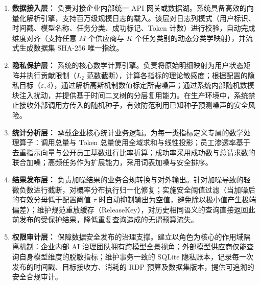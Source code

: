 \begin{enumerate}[label=\textbf{\arabic*.}, leftmargin=2em]
  \item \textbf{数据接入层：}
  负责对接企业内部统一 API 网关或数据湖。系统具备高效的向量化解析引擎，支持百万级规模日志的载入。该层对日志列模式（用户标识、时间戳、模型名称、任务分类、成功标记、Token 计数）进行校验，自动完成维度对齐（支持任意 $M$ 个供应商与 $K$ 个任务类别的动态分类学映射），并流式生成数据集 SHA-256 唯一指纹。
  
  \item \textbf{隐私保护层：}
  系统的核心数学计算引擎。负责将原始明细映射为用户状态矩阵并执行贡献限制（$L_2$ 范数截断），计算各指标的理论敏感度；根据配置的隐私目标（$\varepsilon, \delta$），通过解析高斯机制数值标定所需噪声；通过系统内部随机数模块注入扰动，并提供基于时间二叉树的分层复用能力。在生产环境中，系统禁止接收外部调用方传入的随机种子，有效防范利用已知种子预测噪声的安全风险。
  
  \item \textbf{统计分析层：}
  承载企业核心统计业务逻辑。为每一类指标定义专属的数学处理算子：调用总量与 Token 总量使用全域求和与线性投影；员工渗透率基于去重指示向量与公开员工基数进行比率折算；成功率采用成功数与总请求数的联合加噪；高频任务作为扩展能力，采用词表加噪与安全排序。
  
  \item \textbf{结果发布层：}
  负责加噪结果的业务合规转换与对外输出。针对加噪导致的轻微负数进行截断，对概率分布执行归一化修复；实施安全阈值过滤（当加噪后的有效分母低于配置阈值 $\tau$ 时自动抑制输出为空值，避免除以极小值产生极端偏差）；维护规范重放缓存（ReleaseKey），对历史相同语义的查询直接返回此前发布的受保护结果，降低重复查询造成的无谓预算流失。
  
  \item \textbf{权限审计层：}
  保障数据安全发布的治理支撑。建立以角色为核心的作用域隔离机制：企业内部 AI 治理团队拥有跨模型全景视角；外部模型供应商仅能查询自身模型维度的脱敏指标；维护事务一致的 SQLite 隐私账本，记录每一次发布的时间戳、目标接收方、消耗的 RDP 预算及数据集版本，提供可追溯的安全合规审计。
\end{enumerate}
